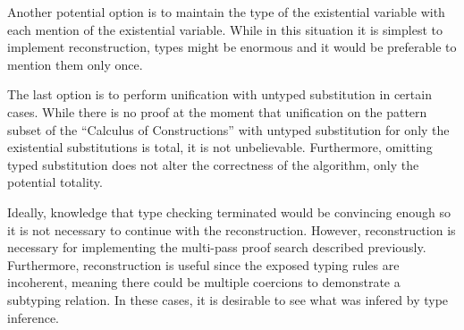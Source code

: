 Another potential option is to maintain the type of the existential variable 
with each mention of the existential variable.  
While in this situation it is simplest to implement reconstruction, 
types might be enormous and it would be preferable to mention them only once.  

The last option is to perform unification with untyped substitution in certain cases.  
While there is no proof at the moment that unification on the pattern subset of 
the ``Calculus of Constructions'' with untyped substitution for only the existential substitutions
is total, it is not unbelievable.  Furthermore, omitting typed substitution does not alter
the correctness of the algorithm, only the potential totality.  

Ideally, knowledge that type checking terminated would be convincing enough
so it is not necessary to continue with the reconstruction.  However, reconstruction
is necessary for implementing the multi-pass proof search described previously.  
Furthermore, reconstruction is useful since the exposed typing rules are incoherent, 
meaning there could be multiple coercions to demonstrate a subtyping relation.  In these cases, it is desirable to see what was infered by type inference.
